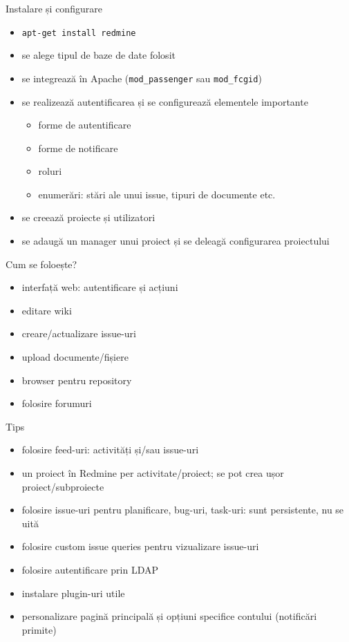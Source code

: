\documentclass{beamer}
\begin{document}
\begin{frame}{Instalare și configurare}
  \begin{itemize}
    \item \texttt{apt-get install redmine}
    \item se alege tipul de baze de date folosit
    \item se integrează în Apache (\texttt{mod\_passenger} sau
    \texttt{mod\_fcgid})
    \item se realizează autentificarea și se configurează elementele
    importante
      \begin{itemize}
        \item forme de autentificare
        \item forme de notificare
        \item roluri
        \item enumerări: stări ale unui issue, tipuri de documente etc.
      \end{itemize}
    \item se creează proiecte și utilizatori
    \item se adaugă un manager unui proiect și se deleagă configurarea
    proiectului
  \end{itemize}
\end{frame}

\begin{frame}{Cum se foloește?}
  \begin{itemize}
    \item interfață web: autentificare și acțiuni
    \item editare wiki
    \item creare/actualizare issue-uri
    \item upload documente/fișiere
    \item browser pentru repository
    \item folosire forumuri
  \end{itemize}
\end{frame}

\begin{frame}{Tips}
  \begin{itemize}
    \item folosire feed-uri: activități și/sau issue-uri
    \item un proiect în Redmine per activitate/proiect; se pot crea ușor
    proiect/subproiecte
    \item folosire issue-uri pentru planificare, bug-uri, task-uri: sunt
    persistente, nu se uită
    \item folosire custom issue queries pentru vizualizare issue-uri
    \item folosire autentificare prin LDAP
    \item instalare plugin-uri utile
    \item personalizare pagină principală și opțiuni specifice contului
    (notificări primite)
  \end{itemize}
\end{frame}
\end{document}
